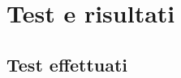 \def\baselinestretch{1}
\section{Test e risultati}
\def\baselinestretch{1.66}
\thispagestyle{headings}

\subsection{Test effettuati}